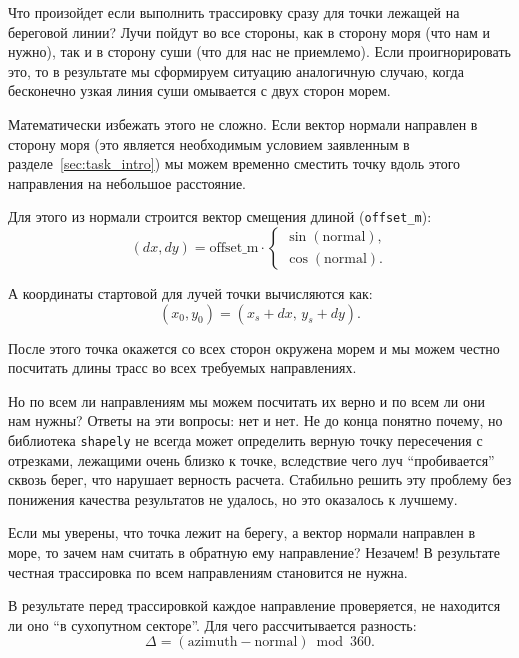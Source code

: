 Что произойдет если выполнить трассировку сразу для точки лежащей на береговой линии?
Лучи пойдут во все стороны, как в сторону моря (что нам и нужно), так и в сторону суши (что для нас не приемлемо).
Если проигнорировать это, то в результате мы сформируем ситуацию аналогичную случаю, когда бесконечно узкая линия суши омывается с двух сторон морем.

Математически избежать этого не сложно.
Если вектор нормали направлен в сторону моря (это является необходимым условием заявленным в разделе~\ref{sec:task_intro}) мы можем временно сместить точку вдоль этого направления на небольшое расстояние.

Для этого из нормали строится вектор смещения длиной (\texttt{offset\_m}):
\begin{equation}
    (dx, dy) = \text{offset\_m} \cdot 
    \begin{cases}
    \sin(\text{normal}),\\
    \cos(\text{normal}).
    \end{cases}
\end{equation}

А координаты стартовой для лучей точки вычисляются как:
\begin{equation}
    (x_0, y_0) = (x_s + dx,\, y_s + dy).
\end{equation}

После этого точка окажется со всех сторон окружена морем и мы можем честно посчитать длины трасс во всех требуемых направлениях.

Но по всем ли направлениям мы можем посчитать их верно и по всем ли они нам нужны?
Ответы на эти вопросы: нет и нет.
Не до конца понятно почему, но библиотека \texttt{shapely} не всегда может определить верную точку пересечения с отрезками, лежащими очень близко к точке, вследствие чего луч \enquote{пробивается} сквозь берег, что нарушает верность расчета.
Стабильно решить эту проблему без понижения качества результатов не удалось, но это оказалось к лучшему.

Если мы уверены, что точка лежит на берегу, а вектор нормали направлен в море, то зачем нам считать в обратную ему направление?
Незачем!
В результате честная трассировка по всем направлениям становится не нужна.

В результате перед трассировкой каждое направление проверяется, не находится ли оно \enquote{в сухопутном секторе}. 
Для чего рассчитывается разность:
\begin{equation}
    \Delta = (\text{azimuth} - \text{normal}) \bmod 360.
\end{equation}

